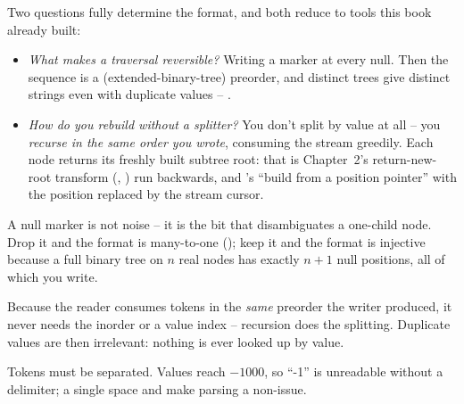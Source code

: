 Two questions fully determine the format, and both reduce to tools this book already built:
\begin{itemize}[nosep, leftmargin=1.4em]
  \item \emph{What makes a traversal reversible?} Writing a marker at every null. Then
        the sequence is a  (extended-binary-tree) preorder, and distinct trees
        give distinct strings even with duplicate values -- .
  \item \emph{How do you rebuild without a splitter?} You don't split by value at all --
        you \emph{recurse in the same order you wrote}, consuming the stream greedily.
        Each node returns its freshly built subtree root: that is Chapter~2's
        return-new-root transform (, ) run
        backwards, and 's ``build from a position pointer'' with
        the position replaced by the stream cursor.
\end{itemize}
\begin{thinkbox}
\end{thinkbox}

\begin{observation}
A null marker is not noise -- it is the bit that disambiguates a one-child node. Drop it
and the format is many-to-one (); keep it and the format is
injective because a full binary tree on $n$ real nodes has exactly $n+1$ null positions,
all of which you write.
\end{observation}
\begin{observation}
Because the reader consumes tokens in the \emph{same} preorder the writer produced, it
never needs the inorder or a value index -- recursion does the splitting. Duplicate values
are then irrelevant: nothing is ever looked up by value.
\end{observation}
\begin{observation}
Tokens must be separated. Values reach $-1000$, so ``-1'' is unreadable
without a delimiter; a single space and  make parsing a non-issue.
\end{observation}

